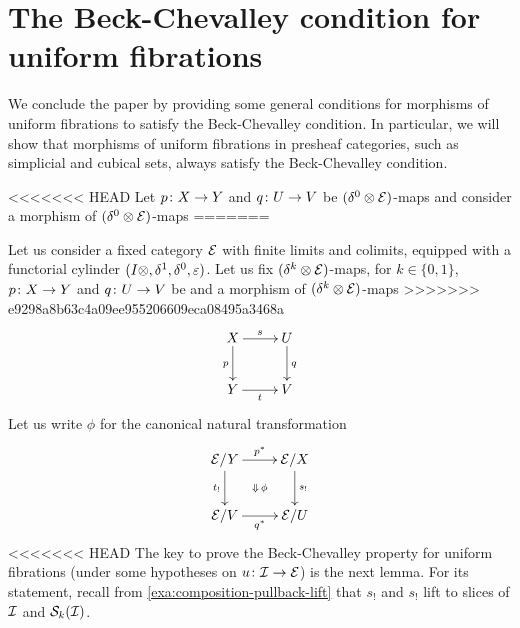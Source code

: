 \documentclass[reqno,10pt,a4paper,oneside,draft]{amsart}
\begin{document}

\section{The Beck-Chevalley condition for uniform fibrations}
\label{sec:becccu}

We conclude the paper by providing some general conditions for morphisms of uniform fibrations to satisfy 
the Beck-Chevalley condition. In particular, we will show that morphisms of uniform fibrations in presheaf
categories, such as simplicial and cubical sets, always satisfy the Beck-Chevalley condition.

<<<<<<< HEAD
Let $p \co X \to Y$ and $q \co U \to V$ be $(\lcyl \otimes \catE)$-maps and consider a morphism of $(\lcyl \otimes \catE)$-maps
=======
\medskip

Let us consider a fixed category $\catE$ with finite limits and colimits, equipped with a functorial cylinder
$(\interval \otimes, \rcyl, \lcyl, \ccyl)$. Let us fix  $(\kcyl \otimes \catE)$-maps, for $k \in \{0 , 1\}$, $p \co X \to Y$ and $q \co U \to V$ be
and a morphism of $(\kcyl \otimes \catE)$-maps
>>>>>>> e9298a8b63c4a09ee955206609eca08495a3468a
\begin{equation} \label{strong-h-equiv-base-change-along-fibration-BC:0}
\begin{gathered}
\xymatrix{
X \ar[r]^s \ar[d]_{p} & U \ar[d]^{q} \\
Y \ar[r]_t & V}
\end{gathered}
\end{equation}
Let us write $\phi$ for the canonical natural transformation
\begin{equation} \label{strong-h-equiv-base-change-along-fibration-BC:1}
\begin{gathered}
\xymatrix{
  \catE/Y
  \ar[r]^{p^*}
  \ar[d]_{t_!}
  \ar@{}[dr]|{\Downarrow \, \phi}
&
  \catE/X
  \ar[d]^{s_!}
\\
  \catE/V
  \ar[r]_{q^*}
&
  \catE/U
}
\end{gathered}
\end{equation}
<<<<<<< HEAD
The key to prove the Beck-Chevalley property for uniform fibrations (under some hypotheses on $u \co \cal{I} \to \cal{E}$) is the next lemma.
For its statement, recall from \cref{exa:composition-pullback-lift} that $s_!$ and $s_!$ lift to slices of $\cal{I}$ and $\cal{S}_k(\cal{I})$.
\end{document}
